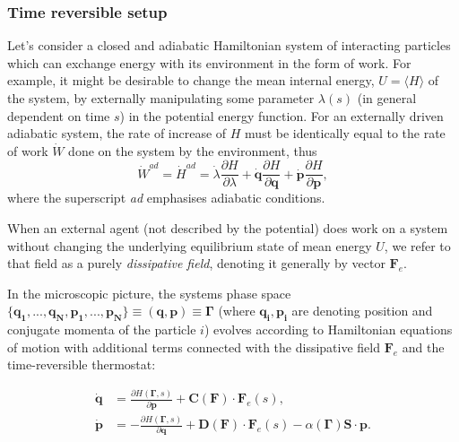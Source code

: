 \documentclass[a4paper,12pt]{article}
\begin{document}
\subsubsection{Time reversible setup}
Let's consider a closed and adiabatic Hamiltonian system of interacting particles which can exchange energy with its environment in the form of work. For example, it might be desirable to change the mean internal energy, $U=\langle H \rangle$ of the system, by externally manipulating some parameter $\lambda(s)$ (in general dependent on time $s$) in the potential energy function. 
For an externally driven adiabatic system, the rate of increase of $H$ must be identically equal to the rate of work $\dot{W}$ done on the system by the environment, thus
\begin{equation}
\label{AdiabaticWork}
  \dot{W}^{ad} = \dot{H}^{ad} = \dot{\lambda} \frac{\partial{H}}{\partial{\lambda}} +\dot{\bm{q}}\frac{\partial{H}}{\partial{\bm{q}}} +\dot{\bm{p}}\frac{\partial{H}}{\partial{\bm{p}}},
\end{equation}
where the superscript \textit{ad} emphasises adiabatic conditions. 

When an external agent (not described by the potential) does work on a system without changing the underlying equilibrium state of mean energy $U$, we refer to that field as a purely \textit{dissipative field}, denoting it generally by vector $\bm{F}_e$.

In the microscopic picture, the systems phase space $\{\bm{q_1},...,\bm{q_N},\bm{p_1},...,\bm{p_N} \} \equiv (\bm{q},\bm{p})\equiv \bm{\Gamma} $ (where $\bm{q_i}, \bm{p_i} $ are denoting position and conjugate momenta of the particle $i$) evolves according to Hamiltonian equations of motion with additional terms connected with the dissipative field $\bm{F}_e$ and the time-reversible thermostat:

\begin{equation}
\begin{aligned}
\label{ThermostattedEq}
  \dot{\bm{q}} &=\frac{\partial H(\bm{\Gamma},s)}{\partial{\bm{p}}}+\bm{C}(\bm{F})\cdot\bm{F}_e(s), \\
  \dot{\bm{p}} &=- \frac{\partial H(\bm{\Gamma},s)}{\partial{\bm{q}}}+\bm{D}(\bm{F})\cdot\bm{F}_e(s) - \alpha(\bm{\Gamma})\bm{S}\cdot\bm{p}.
\end{aligned}
\end{equation}
\end{document}
